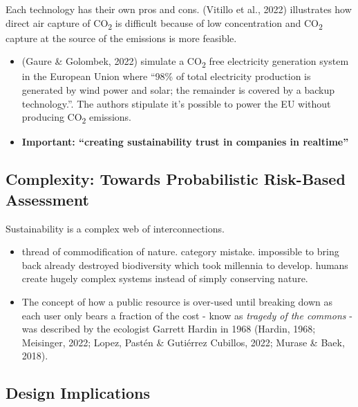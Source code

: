 \documentclass[
  letterpaper,
  DIV=11,
  numbers=noendperiod]{scrartcl}
\begin{document}
Each technology has their own pros and cons. (Vitillo et al., 2022)
illustrates how direct air capture of CO\textsubscript{2} is difficult
because of low concentration and CO\textsubscript{2} capture at the
source of the emissions is more feasible.

\begin{itemize}
\item
  (Gaure \& Golombek, 2022) simulate a CO\textsubscript{2} free
  electricity generation system in the European Union where ``98\% of
  total electricity production is generated by wind power and solar; the
  remainder is covered by a backup technology.''. The authors stipulate
  it's possible to power the EU without producing CO\textsubscript{2}
  emissions.
\item
  \textbf{Important: ``creating sustainability trust in companies in
  realtime''}
\end{itemize}

\subsection{Complexity: Towards Probabilistic Risk-Based
Assessment}\label{complexity-towards-probabilistic-risk-based-assessment}

Sustainability is a complex web of interconnections.

\begin{itemize}
\item
  thread of commodification of nature. category mistake. impossible to
  bring back already destroyed biodiversity which took millennia to
  develop. humans create hugely complex systems instead of simply
  conserving nature.
\item
  The concept of how a public resource is over-used until breaking down
  as each user only bears a fraction of the cost - know as \emph{tragedy
  of the commons} -was described by the ecologist Garrett Hardin in 1968
  (Hardin, 1968; Meisinger, 2022; Lopez, Pastén \& Gutiérrez Cubillos,
  2022; Murase \& Baek, 2018).
\end{itemize}

\subsection{Design Implications}\label{design-implications-1}
\end{document}
